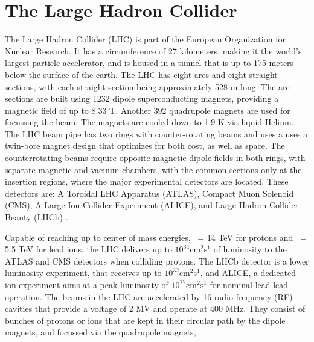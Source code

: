 
\section{The Large Hadron Collider}

The Large Hadron Collider (LHC) is part of the European Organization for Nuclear Research. It has a circumference of 27 kilometers, making it the world's largest particle accelerator, and is housed in a tunnel that is up to 175 meters below the surface of the earth. The LHC has eight arcs and eight straight sections, with each straight section being approximately 528 m long. The arc sections are built using 1232 dipole superconducting magnets, providing a magnetic field of up to 8.33 T. Another 392 quadrupole magnets are used for focussing the beam. The magnets are cooled down to 1.9 K via liquid Helium. The LHC beam pipe has two rings with counter-rotating beams and uses a uses a twin-bore magnet design that optimizes for both cost, as well as space. The counterrotating beams require opposite magnetic dipole fields in both rings, with separate magnetic and vacuum chambers, with the common sections only at the insertion regions, where the major experimental detectors are located. These detectors are: A Toroidal LHC Apparatus (ATLAS), Compact Muon Solenoid (CMS), A Large Ion Collider Experiment (ALICE), and Large Hadron Collider - Beauty (LHCb) \cite{Evans:2008zzb}.

Capable of reaching up to center of mass energies, \sqrts\ = 14 TeV for protons and \sqrtsnn\ = 5.5 TeV for lead ions, the LHC delivers up to $10^{34} \mathrm{cm}^2\mathrm{s}^1$ of luminosity to the ATLAS and CMS detectors when colliding protons. The LHCb detector is a lower luminosity experiment, that receives up to $10^{32} \mathrm{cm}^2\mathrm{s}^1$, and ALICE, a dedicated ion experiment aims at a peak luminosity of $10^{27} \mathrm{cm}^2\mathrm{s}^1$ for nominal lead-lead operation. The beams in the LHC are accelerated by 16 radio frequency (RF) cavities that provide a voltage of 2 MV and operate at 400 MHz. They consist of bunches of protons or ions that are kept in their circular path by the dipole magnets, and focussed via the quadrupole magnets, 


